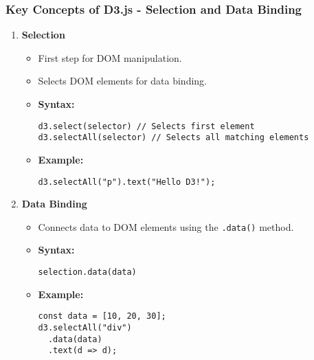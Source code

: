 \documentclass{beamer}
\begin{document}
\begin{frame}[fragile]
    \frametitle{Key Concepts of D3.js - Selection and Data Binding}
    \begin{enumerate}
        \item \textbf{Selection}
        \begin{itemize}
            \item First step for DOM manipulation.
            \item Selects DOM elements for data binding.
            \item \textbf{Syntax:}
            \begin{lstlisting}
d3.select(selector) // Selects first element
d3.selectAll(selector) // Selects all matching elements
            \end{lstlisting}
            \item \textbf{Example:}
            \begin{lstlisting}
d3.selectAll("p").text("Hello D3!");
            \end{lstlisting}
        \end{itemize}

        \item \textbf{Data Binding}
        \begin{itemize}
            \item Connects data to DOM elements using the \texttt{.data()} method.
            \item \textbf{Syntax:}
            \begin{lstlisting}
selection.data(data)
            \end{lstlisting}
            \item \textbf{Example:}
            \begin{lstlisting}
const data = [10, 20, 30];
d3.selectAll("div")
  .data(data)
  .text(d => d);
            \end{lstlisting}
        \end{itemize}
    \end{enumerate}
\end{frame}
\end{document}
